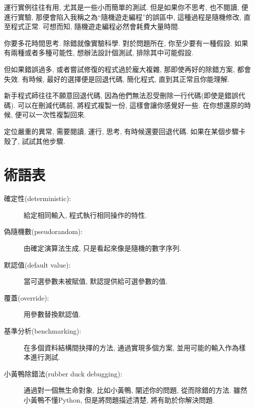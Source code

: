 \documentclass[10pt]{book}
\begin{document}
運行實例往往有用, 尤其是一些小而簡單的測試. 但是如果你不思考, 也不閱讀, 
便進行實驗, 那便會陷入我稱之為``隨機遊走編程''的誤區中, 
這種過程是隨機修改, 直至程式正常. 可想而知, 隨機遊走編程必然會耗費大量時間. 

你要多花時間思考. 
除錯就像實驗科學. 
對於問題所在, 你至少要有一種假設. 
如果有兩種或者多種可能性, 想辦法設計個測試, 排除其中可能假設. 

但如果錯誤過多, 或者嘗試修復的程式過於龐大複雜, 
那即使再好的除錯方案, 都會失效. 
有時候, 最好的選擇便是回退代碼, 簡化程式, 直到其正常且你能理解. 

新手程式師往往不願意回退代碼, 因為他們無法忍受刪除一行代碼(即使是錯誤代碼). 
可以在刪減代碼前, 將程式複製一份, 這樣會讓你感覺好一些. 
在你想還原的時候, 便可以一次性複製回來. 

定位嚴重的異常, 需要閱讀, 運行, 思考, 有時候還要回退代碼. 
如果在某個步驟卡殼了, 試試其他步驟. 


\section{術語表}

\begin{description}

\item[確定性(deterministic):] 給定相同輸入, 程式執行相同操作的特性. 

\item[偽隨機數(pseudorandom):] 由確定演算法生成, 只是看起來像是隨機的數字序列. 

\item[默認值(default value):] 當可選參數未被賦值, 默認提供給可選參數的值. 

\item[覆蓋(override):] 用參數替換默認值. 

\item[基準分析(benchmarking):] 在多個資料結構間抉擇的方法, 通過實現多個方案, 
並用可能的輸入作為樣本進行測試. 

\item[小黃鴨除錯法(rubber duck debugging):] 通過對一個無生命對象, 比如小黃鴨, 闡述你的問題, 
從而除錯的方法. 雖然小黃鴨不懂Python, 但是將問題描述清楚, 將有助於你解決問題. 

\end{description}
\end{document}
